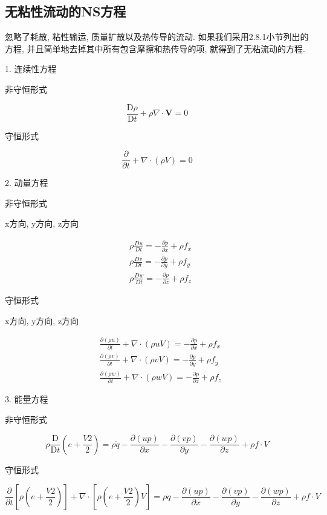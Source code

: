 \subsection{无粘性流动的NS方程}
忽略了耗散, 粘性输运, 质量扩散以及热传导的流动. 如果我们采用2.8.1小节列出的方程, 并且简单地去掉其中所有包含摩擦和热传导的项, 就得到了无粘流动的方程.

1. 连续性方程

非守恒形式

$$
	\frac{\mathrm{D} \rho}{\mathrm{D} t}+\rho \nabla \cdot \boldsymbol{V}=0
$$

守恒形式


$$
	\frac{\partial}{\partial t}+\nabla \cdot(\rho V)=0
$$

2. 动量方程

非守恒形式

x方向, y方向, z方向

$$
	\begin{aligned}
		 & \rho \frac{D u}{D t}=-\frac{\partial p}{\partial x}+\rho f_{x} \\
		 & \rho \frac{D v}{D t}=-\frac{\partial p}{\partial y}+\rho f_{y} \\
		 & \rho \frac{D w}{D t}=-\frac{\partial p}{\partial z}+\rho f_{z}
	\end{aligned}
$$

守恒形式

x方向, y方向, z方向

$$
	\begin{aligned}
		 & \frac{\partial(\rho u)}{\partial t}+\nabla \cdot(\rho u V)=-\frac{\partial p}{\partial x}+\rho f_{x} \\
		 & \frac{\partial(\rho v)}{\partial t}+\nabla \cdot(\rho v V)=-\frac{\partial p}{\partial y}+\rho f_{y} \\
		 & \frac{\partial(\rho w)}{\partial t}+\nabla \cdot(\rho w V)=-\frac{\partial p}{\partial z}+\rho f_{z}
	\end{aligned}
$$

3. 能量方程

非守恒形式

$$
	\rho \frac{\mathrm{D}}{\mathrm{D} t}\left(e+\frac{V 2}{2}\right)=\rho \dot{q}-\frac{\partial(u p)}{\partial x}-\frac{\partial(v p)}{\partial y}-\frac{\partial(w p)}{\partial z}+\rho f \cdot V
$$

守恒形式

$$
	\frac{\partial}{\partial t}\left[\rho\left(e+\frac{V 2}{2}\right)\right]+\nabla \cdot\left[\rho\left(e+\frac{V 2}{2}\right) V\right]=\rho \dot{q}-\frac{\partial(u p)}{\partial x}-\frac{\partial(v p)}{\partial y}-\frac{\partial(w p)}{\partial z}+\rho f \cdot V
$$

